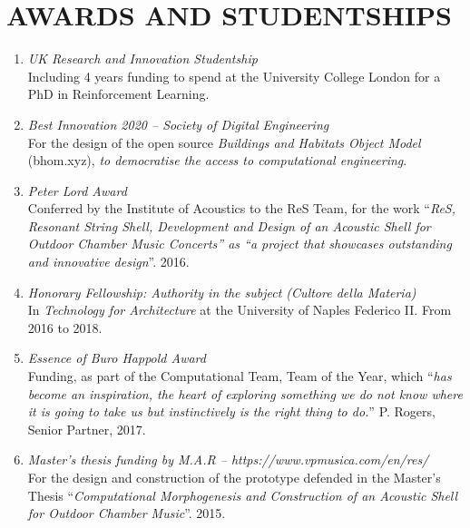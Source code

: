 \section*{AWARDS AND STUDENTSHIPS}
    \begin{enumerate}[leftmargin=0.45cm, itemsep=0em, topsep=0.5em, parsep=0.2em]
        \item
        \emph{UK Research and Innovation Studentship} \\
        Including 4 years funding to spend at the University College London for a PhD in Reinforcement Learning.
        \item
        \emph{Best Innovation 2020 – Society of Digital Engineering} \\
        For the design of the open source \textit{Buildings and Habitats Object Model} (bhom.xyz), \textit{to democratise the access to computational engineering}.
        \item
        \emph{Peter Lord Award} \\
        Conferred by the Institute of Acoustics to the ReS Team, for the work “\textit{ReS, Resonant String Shell, Development and Design of an Acoustic Shell for Outdoor Chamber Music Concerts” as “a project that showcases outstanding and innovative design}”. 2016.
        \item
        \emph{Honorary Fellowship: Authority in the subject (Cultore della Materia)} \\
        In \textit{Technology for Architecture} at the University of Naples Federico II.
        From 2016 to 2018.
        \item
        \emph{Essence of Buro Happold Award} \\
        Funding, as part of the Computational Team, Team of the Year, which “\textit{has become an inspiration, the heart of exploring something we do not know where it is going to take us but instinctively is the right thing to do.}” P. Rogers, Senior Partner, 2017.
        \item
        \emph{Master’s thesis funding by M.A.R – https://www.vpmusica.com/en/res/}  \\
    For the design and construction of the prototype defended in the Master’s Thesis “\textit{Computational Morphogenesis and Construction of an Acoustic Shell for Outdoor Chamber Music}”. 2015.
    \end{enumerate}